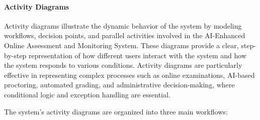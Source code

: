 \paragraph{Activity Diagrams}
Activity diagrams illustrate the dynamic behavior of the system by modeling workflows, decision points, and parallel activities involved in the AI-Enhanced Online Assessment and Monitoring System. These diagrams provide a clear, step-by-step representation of how different users interact with the system and how the system responds to various conditions. Activity diagrams are particularly effective in representing complex processes such as online examinations, AI-based proctoring, automated grading, and administrative decision-making, where conditional logic and exception handling are essential.

The system’s activity diagrams are organized into three main workflows:

